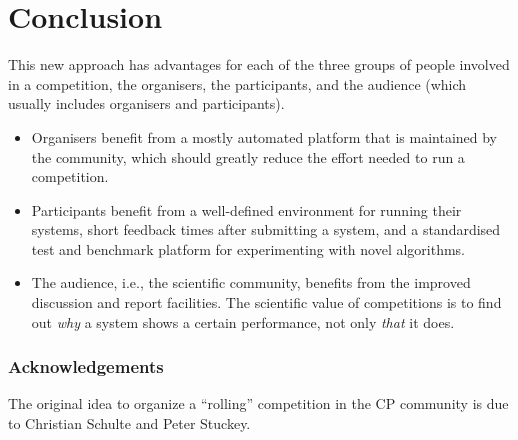 \section{Conclusion}
\label{sec:conclusion}


This new approach has advantages for each of the three groups of people involved in a competition, the organisers, the participants, and the audience (which usually includes organisers and participants).

\begin{itemize}
  \item Organisers benefit from a mostly automated platform that is maintained by the community, which should greatly reduce the effort needed to run a competition.
  \item Participants benefit from a well-defined environment for running their systems, short feedback times after submitting a system, and a standardised test and benchmark platform for experimenting with novel algorithms.
  \item The audience, i.e., the scientific community, benefits from the improved discussion and report facilities. The scientific value of competitions is to find out \emph{why} a system shows a certain performance, not only \emph{that} it does.
\end{itemize}



\subsubsection*{Acknowledgements}
The original idea to organize a ``rolling'' competition in the CP community is due to Christian Schulte and Peter Stuckey.
